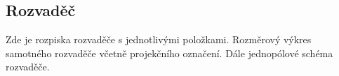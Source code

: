 \begin{Czech}
\section{Rozvaděč}
\end{Czech}

\begin{Czech}
Zde je rozpiska rozvaděče s jednotlivými položkami. Rozměrový výkres samotného rozvaděče včetně projekčního označení. Dále jednopólové schéma rozvaděče.
\end{Czech}

\begin{Czech}





\end{Czech}


